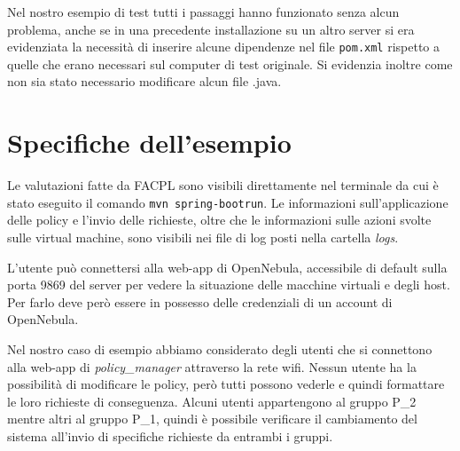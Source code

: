 Nel nostro esempio di test tutti i passaggi hanno funzionato senza alcun problema, anche se in una precedente installazione su un altro server si era evidenziata la necessità di inserire alcune dipendenze nel file \texttt{pom.xml} rispetto a quelle che erano necessari sul computer di test originale. Si evidenzia inoltre come non sia stato necessario modificare alcun file .java.

\section{Specifiche dell'esempio}
Le valutazioni fatte da FACPL sono visibili direttamente nel terminale da cui è stato eseguito il comando \texttt{mvn spring-boot\:run}. Le informazioni sull'applicazione delle policy e l'invio delle richieste, oltre che le informazioni sulle azioni svolte sulle virtual machine, sono visibili nei file di log posti nella cartella \emph{logs}.\par
L'utente può connettersi alla web-app di OpenNebula, accessibile di default sulla porta 9869 del server per vedere la situazione delle macchine virtuali e degli host. Per farlo deve però essere in possesso delle credenziali di un account di OpenNebula.\par
Nel nostro caso di esempio abbiamo considerato degli utenti che si connettono alla web-app di \emph{policy\_manager} attraverso la rete wifi. Nessun utente ha la possibilità di modificare le policy, però tutti possono vederle e quindi formattare le loro richieste di conseguenza. Alcuni utenti appartengono al gruppo P\_2 mentre altri al gruppo P\_1, quindi è possibile verificare il cambiamento del sistema all'invio di specifiche richieste da entrambi i gruppi.

